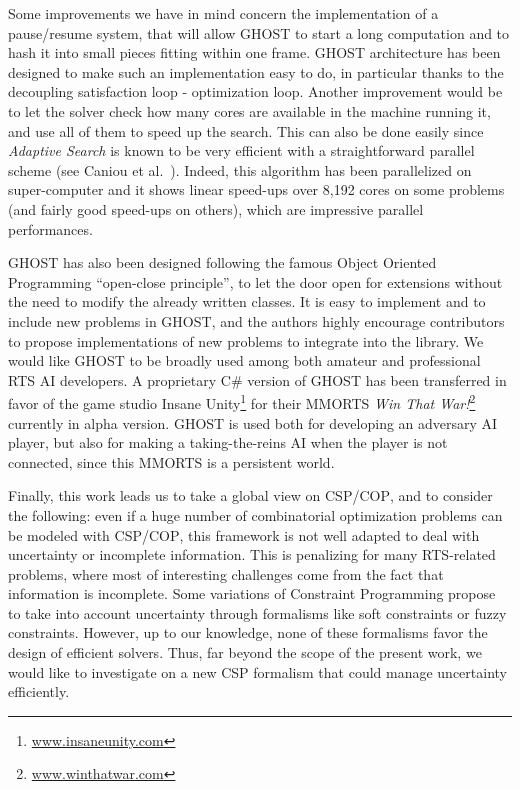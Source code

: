 \documentclass[journal]{IEEEtran}
\newcommand{\csp}{\textsc{CSP}\xspace}
\newcommand{\cop}{\textsc{COP}\xspace}
\newcommand{\ghost}{\textsc{GHOST}\xspace}
\begin{document}
Some  improvements we  have in  mind concern the implementation  of a
pause/resume system, that will allow  \ghost to start a  long computation and
to hash it into small pieces fitting  within one frame. %
\ghost architecture has been designed to make such an implementation
easy to do, in particular thanks to the decoupling satisfaction loop -
optimization loop. Another improvement would be to let the solver
check how many cores are available in the machine running it, and use
all of them to speed up the search. This can also be done easily since
{\it Adaptive Search} is known to be very efficient with a
straightforward parallel scheme (see Caniou et
al.~\cite{Caniou14}). Indeed, this algorithm has been parallelized on
super-computer and it shows linear speed-ups over 8,192 cores on some
problems (and fairly good speed-ups on others), which are impressive
parallel performances.

\ghost has also been designed following the famous Object Oriented
Programming ``open-close principle'', to let the door open for
extensions without the need to modify the already written classes. It
is easy to implement and to include new problems in \ghost, and the
authors highly encourage contributors to propose implementations of
new problems to integrate into the library. We would like \ghost to be
broadly used among both amateur and professional RTS AI developers. A
proprietary C\# version of \ghost has been transferred in favor of the game
studio Insane
Unity\footnote{\href{http://www.insaneunity.com}{www.insaneunity.com}}
for their MMORTS \emph{Win That
  War!}\footnote{\href{http://www.winthatwar.com}{www.winthatwar.com}}
currently in alpha version. \ghost is used both for developing an
adversary AI player, but also for making a taking-the-reins AI when
the player is not connected, since this MMORTS is a persistent
world.


Finally, this work leads us to take a global view on \csp/\cop, and to
consider the  following: even  if a huge  number of  combinatorial optimization problems can be modeled with \csp/\cop, this framework is
not   well   adapted   to   deal  with   uncertainty   or   incomplete
information. This  is penalizing for many  RTS-related problems, where
most of interesting challenges come  from the fact that information is
incomplete. Some variations of  Constraint Programming propose to take
into account  uncertainty through formalisms like  soft constraints or
fuzzy constraints. However, up to our  knowledge, none of these formalisms  favor the design
of efficient solvers. Thus, far beyond the scope
of  the present  work, we  would  like to  investigate on  a new  \csp
formalism that could manage uncertainty efficiently.
\end{document}
